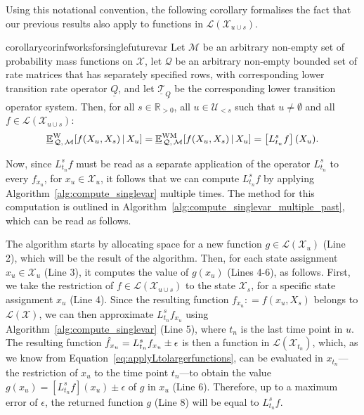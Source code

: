 \documentclass[10pt,a4paper]{paper}
\theoremstyle{definition}
\newcommand{\reals}{\mathbb{R}}
\newcommand{\realspos}{\reals_{>0}}
\newcommand{\states}{\mathcal{X}}
\newcommand{\gambles}{\mathcal{L}}
\newcommand{\gamblesX}{\gambles(\states)}
\newcommand{\rateset}{\mathcal{Q}}
\newcommand{\lrate}{\underline{Q}}
\newcommand{\coloneqq}{:\!=}
\begin{document}
Using this notational convention, the following corollary formalises the fact that our previous results also apply to functions in $\gambles(\states_{u\cup s})$.

\begin{restatable}{corollary}{corinfworksforsinglefuturevar}
\label{cor:inf_works_for_single_future_var}
Let $\mathcal{M}$ be an arbitrary non-empty set of probability mass functions on $\states$, let $\rateset$ be an arbitrary non-empty bounded set of rate matrices that has separately specified rows, with corresponding lower transition rate operator $\lrate$, and let $\underline{\mathcal{T}}_{\lrate}$ be the corresponding lower transition operator system. Then, for all $s\in\realspos$, all $u\in\mathcal{U}_{<s}$ such that $u\neq\emptyset$ and all $f\in\gambles(\states_{u\cup s})$:
\begin{equation*}
\underline{\mathbb{E}}^\mathrm{W}_{\,\rateset,\,\mathcal{M}}[f(X_u,X_s)\,\vert\,X_u]=\underline{\mathbb{E}}^{\mathrm{WM}}_{\,\rateset,\,\mathcal{M}}[f(X_u,X_s)\,\vert\,X_u]=\left[L_{t_n}^s f\right](X_u).\vspace{3pt}
\end{equation*}
\end{restatable}

Now, since $L_{t_n}^sf$ must be read as a separate application of the operator $L_{t_n}^s$ to every $f_{x_u}$, for $x_u\in\states_u$, it follows that we can compute $L_{t_n}^sf$ by applying Algorithm~\ref{alg:compute_singlevar} multiple times.
The method for this computation is outlined in Algorithm~\ref{alg:compute_singlevar_multiple_past}, which can be read as follows. 

The algorithm starts by allocating space for a new function $g\in\gambles(\states_u)$ (Line 2), which will be the result of the algorithm. Then, for each state assignment $x_u\in\states_u$ (Line 3), it computes the value of $g(x_u)$ (Lines 4-6), as follows. First, we take the restriction of $f\in\gambles(\states_{u\cup s})$ to the state $\states_s$, for a specific state assignment $x_u$ (Line 4). Since the resulting function $f_{x_u}\coloneqq f(x_u,X_s)$ belongs to $\gamblesX$, we can then approximate $L_{t_n}^sf_{x_u}$ using Algorithm~\ref{alg:compute_singlevar} (Line 5), where $t_n$ is the last time point in $u$. The resulting function $\smash{\hat{f}_{x_u}=L_{t_n}^sf_{x_u}}\pm\epsilon$ is then a function in $\gambles(\states_{t_n})$, which, as we know from Equation~\eqref{eq:applyLtolargerfunctions}, can be evaluated in $x_{t_n}$---the restriction of $x_u$ to the time point $t_n$---to obtain the value $g(x_u)=[L_{t_n}^sf](x_u)\pm\epsilon$ of $g$ in $x_u$ (Line 6). Therefore, up to a maximum error of $\epsilon$, the returned function $g$ (Line 8) will be equal to $L_{t_n}^sf$.
\end{document}
